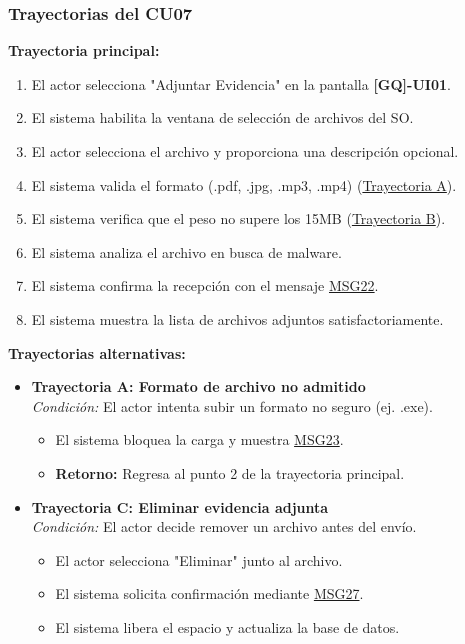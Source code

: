 \begin{appendices}
\subsubsection{Trayectorias del CU07}
\textbf{Trayectoria principal:}
\begin{enumerate}[nosep]
    \item El actor selecciona "Adjuntar Evidencia" en la pantalla \textbf{[GQ]-UI01}.
    \item El sistema habilita la ventana de selección de archivos del SO.
    \item El actor selecciona el archivo y proporciona una descripción opcional.
    \item El sistema valida el formato (.pdf, .jpg, .mp3, .mp4) (\hyperlink{msg:MSG23}{Trayectoria A}).
    \item El sistema verifica que el peso no supere los 15MB (\hyperlink{msg:MSG24}{Trayectoria B}).
    \item El sistema analiza el archivo en busca de malware.
    \item El sistema confirma la recepción con el mensaje \hyperlink{msg:MSG22}{MSG22}.
    \item El sistema muestra la lista de archivos adjuntos satisfactoriamente.
\end{enumerate}

\textbf{Trayectorias alternativas:}
\begin{itemize}[leftmargin=*]
    \item \textbf{Trayectoria A: Formato de archivo no admitido} \\
    \textit{Condición:} El actor intenta subir un formato no seguro (ej. .exe).
    \begin{itemize}[nosep]
        \item[A-1:] El sistema bloquea la carga y muestra \hyperlink{msg:MSG23}{MSG23}.
        \item \textbf{Retorno:} Regresa al punto 2 de la trayectoria principal.
    \end{itemize}
    \item \textbf{Trayectoria C: Eliminar evidencia adjunta} \\
    \textit{Condición:} El actor decide remover un archivo antes del envío.
    \begin{itemize}[nosep]
        \item[C-1:] El actor selecciona "Eliminar" junto al archivo.
        \item[C-2:] El sistema solicita confirmación mediante \hyperlink{msg:MSG27}{MSG27}.
        \item[C-3:] El sistema libera el espacio y actualiza la base de datos.
    \end{itemize}
\end{itemize}


\end{appendices}
